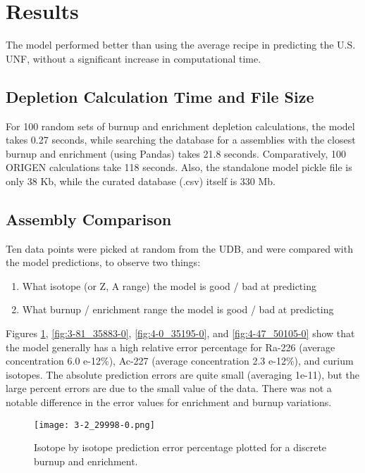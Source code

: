 \section{Results}

The model performed better than using the average
recipe in predicting the U.S. \gls{UNF}, without
a significant increase in computational time.

\subsection{Depletion Calculation Time and File Size}
For 100 random sets of
burnup and enrichment depletion calculations,
the model takes 0.27 seconds, while
searching the database for a assemblies
with the closest burnup and enrichment (using Pandas)
takes 21.8 seconds. Comparatively, 100 \gls{ORIGEN} calculations
take 118 seconds. Also, the standalone model pickle file is only
38 Kb, while the curated database (.csv) itself is 330 Mb.

\subsection{Assembly Comparison}

Ten data points were picked at random from the \gls{UDB},
and were compared with the model predictions, to observe
two things:
\begin{enumerate}
    \item What isotope (or Z, A range) the model is good / bad
        at predicting
    \item What burnup / enrichment range the model is good / bad
        at predicting
\end{enumerate}

Figures \ref{fig:3-2_29998-0}, \ref{fig:3-81_35883-0},
\ref{fig:4-0_35195-0}, and \ref{fig:4-47_50105-0}
show that the model
generally has a high relative error percentage for Ra-226
(average concentration 6.0 e-12\%), Ac-227 (average concentration  2.3 e-12\%), and curium isotopes.
The absolute prediction errors are quite small
(averaging 1e-11), but the large percent errors are due
to the small value of the data. There was not a notable
difference in the error values for enrichment
and burnup variations.

\begin{figure}
    \centering
    \texttt{[image: 3-2\_29998-0.png]}
    \caption{Isotope by isotope prediction error percentage
             plotted for a discrete burnup and enrichment.}
    \label{fig:3-2_29998-0}
\end{figure}

